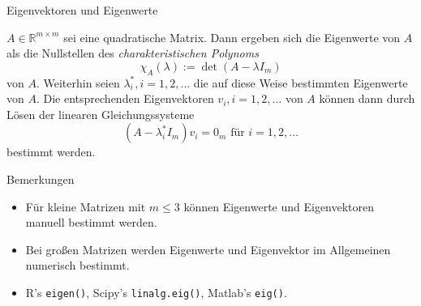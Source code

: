 \documentclass[
  8pt,
  ignorenonframetext,
]{beamer}
\providecommand{\tightlist}{%
  \setlength{\itemsep}{0pt}\setlength{\parskip}{0pt}}
\begin{document}
\begin{frame}[fragile]{Eigenvektoren und Eigenwerte}
\protect\hypertarget{eigenvektoren-und-eigenwerte-3}{}
\small
\begin{theorem}
\normalfont
\justifying
$A \in \mathbb{R}^{m \times m}$ sei eine quadratische Matrix. Dann ergeben sich
die Eigenwerte von $A$ als die Nullstellen des \textit{charakteristischen Polynoms}
\begin{equation}
\chi_A(\lambda) := \det(A - \lambda I_m) 
\end{equation}
von $A$. Weiterhin seien $\lambda_i^*, i = 1,2,...$ die auf diese Weise bestimmten
Eigenwerte von $A$. Die entsprechenden Eigenvektoren $v_i, i = 1,2,...$ von $A$
können dann durch Lösen der linearen Gleichungssysteme
\begin{equation}
(A - \lambda_i^* I_m)v_i = 0_m \mbox{ für } i = 1,2,...
\end{equation}
bestimmt werden.
\end{theorem}

\footnotesize

Bemerkungen

\begin{itemize}
\tightlist
\item
  Für kleine Matrizen mit \(m \le 3\) können Eigenwerte und
  Eigenvektoren manuell bestimmt werden.
\item
  Bei großen Matrizen werden Eigenwerte und Eigenvektor im Allgemeinen
  numerisch bestimmt.
\item
  R's \texttt{eigen()}, Scipy's \texttt{linalg.eig()}, Matlab's
  \texttt{eig()}.
\end{itemize}
\end{frame}
\end{document}
